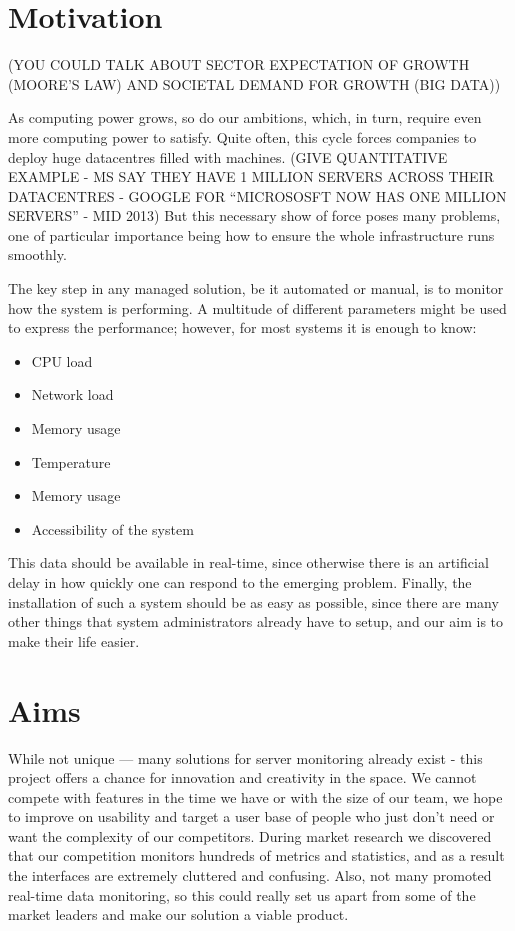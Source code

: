 \documentclass{l3proj}
\begin{document}
\section{Motivation}
\label{motivation}

(YOU COULD TALK ABOUT SECTOR EXPECTATION OF GROWTH (MOORE'S LAW) AND SOCIETAL DEMAND FOR GROWTH (BIG DATA))

As computing power grows, so do our ambitions, which, in turn, require even more computing power to satisfy. Quite often, this cycle forces companies to deploy huge datacentres filled with machines. (GIVE QUANTITATIVE EXAMPLE - MS SAY THEY HAVE 1 MILLION SERVERS ACROSS THEIR DATACENTRES - GOOGLE FOR ``MICROSOSFT NOW HAS ONE MILLION SERVERS'' - MID 2013) But this necessary show of force poses many problems, one of particular importance being how to ensure the whole infrastructure runs smoothly.

The key step in any managed solution, be it automated or manual, is to monitor how the system is performing. A multitude of different parameters might be used to express the performance; however, for most systems it is enough to know:

\begin{itemize}
  \item CPU load
  \item Network load
  \item Memory usage
  \item Temperature
  \item Memory usage
  \item Accessibility of the system
\end{itemize}

This data should be available in real-time, since otherwise there is an artificial delay in how quickly one can respond to the emerging problem. Finally, the installation of such a system should be as easy as possible, since there are many other things that system administrators already have to setup, and our aim is to make their life easier.


\section{Aims}
\label{aims}

While not unique --- many solutions for server monitoring already exist - this project offers a chance for innovation and creativity in the space. We cannot compete with features in the time we have or with the size of our team, we hope to improve on usability and target a user base of people who just don’t need or want the complexity of our competitors. During market research we discovered that our competition monitors hundreds of metrics and statistics, and as a result the interfaces are extremely cluttered and confusing. Also, not many promoted real-time data monitoring, so this could really set us apart from some of the market leaders and make our solution a viable product.
\end{document}
